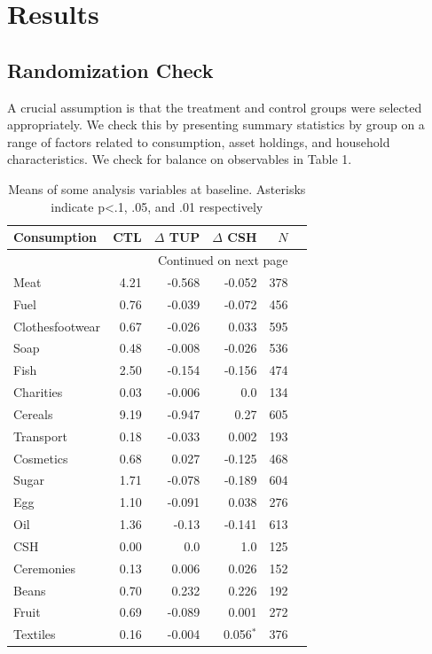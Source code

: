\documentclass[12pt,article]{article}
\begin{document}
\section{Results}
\label{sec-3}
\subsection{Randomization Check}
\label{sec-3-1}

A crucial assumption is that the treatment and control groups were selected
appropriately. We check this by presenting summary statistics by group on a
range of factors related to consumption, asset holdings, and household
characteristics. We check for balance on observables in Table 1.

\begin{longtable}{lrrrrr}
\caption{\label{tab:balance_check}Means of some analysis variables at baseline.  Asterisks indicate p<.1, .05, and .01 respectively}
\\
\hline
Consumption & CTL & $\Delta$ TUP & $\Delta$ CSH & $N$\\
\hline
\endhead
\hline\multicolumn{5}{r}{Continued on next page} \\
\endfoot
\endlastfoot
Meat & 4.21 & -0.568 & -0.052 & 378\\
Fuel & 0.76 & -0.039 & -0.072 & 456\\
Clothesfootwear & 0.67 & -0.026 & 0.033 & 595\\
Soap & 0.48 & -0.008 & -0.026 & 536\\
Fish & 2.50 & -0.154 & -0.156 & 474\\
Charities & 0.03 & -0.006 & 0.0 & 134\\
Cereals & 9.19 & -0.947 & 0.27 & 605\\
Transport & 0.18 & -0.033 & 0.002 & 193\\
Cosmetics & 0.68 & 0.027 & -0.125 & 468\\
Sugar & 1.71 & -0.078 & -0.189 & 604\\
Egg & 1.10 & -0.091 & 0.038 & 276\\
Oil & 1.36 & -0.13 & -0.141 & 613\\
CSH & 0.00 & 0.0 & 1.0 & 125\\
Ceremonies & 0.13 & 0.006 & 0.026 & 152\\
Beans & 0.70 & 0.232 & 0.226 & 192\\
Fruit & 0.69 & -0.089 & 0.001 & 272\\
Textiles & 0.16 & -0.004 & 0.056$^{\text{*}}$ & 376\\

\end{longtable}
\end{document}
